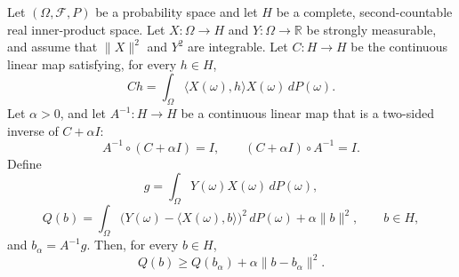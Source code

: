 \begin{theorem}
Let $(\Omega,\mathcal F,P)$ be a probability space and let $H$ be a
complete, second-countable real inner-product space.  Let
$X:\Omega\to H$ and $Y:\Omega\to\mathbb R$ be strongly measurable, and
assume that $\|X\|^2$ and $Y^2$ are integrable.  Let $C:H\to H$ be the
continuous linear map satisfying, for every $h\in H$,
\[
  Ch=\int_\Omega\langle X(\omega),h\rangle X(\omega)\,dP(\omega).
\]
Let $\alpha>0$, and let $A^{-1}:H\to H$ be a continuous linear map that is
a two-sided inverse of $C+\alpha I$:
\[
  A^{-1}\circ(C+\alpha I)=I,
  \qquad
  (C+\alpha I)\circ A^{-1}=I.
\]
Define
\[
  g=\int_\Omega Y(\omega)X(\omega)\,dP(\omega),
\]
\[
  Q(b)=\int_\Omega
    \bigl(Y(\omega)-\langle X(\omega),b\rangle\bigr)^2\,dP(\omega)
    +\alpha\|b\|^2,
  \qquad b\in H,
\]
and $b_\alpha=A^{-1}g$.  Then, for every $b\in H$,
\[
  Q(b)\ge Q(b_\alpha)+\alpha\|b-b_\alpha\|^2.
\]
\end{theorem}
